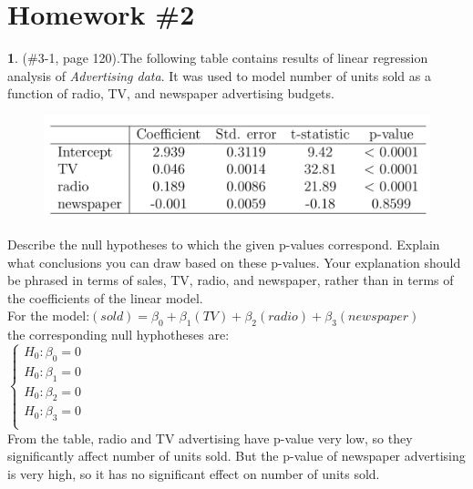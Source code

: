 \documentclass[12pt,fleqn]{article}\usepackage[]{graphicx}\usepackage[]{color}
\theoremstyle{definition}
\newtheorem{problem}{}
\begin{document}
\rhead{\today}




\section*{Homework \#2}
	\begin{problem} (\#3-1, page 120).The following table contains results of linear regression analysis of \textit{Advertising data}. It was used to model number of units sold as a function of radio, TV, and newspaper advertising budgets.
	  \begin{figure}[h!]
	  \centering
	    \includegraphics[width=0.65\linewidth]{chart.png}
	  \end{figure}
	  Describe the null hypotheses to which the given p-values correspond. Explain what conclusions you can draw based on these p-values. Your explanation should be phrased in terms of sales, TV, radio, and newspaper, rather than in terms of the coefficients of the linear model.
  \\[5pt]
  For the model:$(sold) = \beta_0 + \beta_1(TV) + \beta_2(radio) + \beta_3(newspaper)$\\
  the corresponding null hyphotheses are:\\
  $\begin{cases}
    H_0: \beta_0 = 0\\
    H_0: \beta_1 = 0\\
    H_0: \beta_2 = 0\\
    H_0: \beta_3 = 0\\
  \end{cases}$\\[5pt]
  From the table, radio and TV advertising have p-value very low, so they significantly affect number of units sold. But the p-value of newspaper advertising is very high, so it has no significant effect on number of units sold.
	\end{problem}
\end{document}

